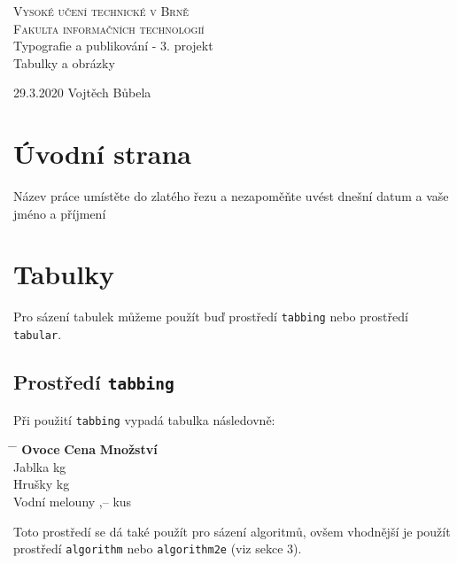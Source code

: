 \documentclass[11pt, ]{article}
\begin{document}
\begin{titlepage}
\begin{center}
\Huge
\textsc{Vysoké učení technické v Brně \\
\huge
Fakulta informačních technologií}\\[0.4em]
\LARGE
Typografie a publikování - 3. projekt\\[0.3em]
\Huge
Tabulky a obrázky
\end{center}
\large29.3.2020 \hfill Vojtěch Bůbela

\end{titlepage}

\section{Úvodní strana}

Název práce umístěte do zlatého řezu a nezapoměňte uvést dnešní datum a vaše jméno a příjmení

\section{Tabulky}
Pro sázení tabulek můžeme použít buď prostředí \verb!tabbing! nebo prostředí \verb!tabular!.

\subsection{Prostředí \texttt{tabbing}}

Při použití \verb!tabbing! vypadá tabulka následovně:

\begin{tabbing}
\hspace{3cm}               \= \hspace{1.5cm}    \= \hspace{2cm}    \kill
\textbf{Ovoce}             \> \textbf{Cena}     \> \textbf{Množství}    \\ 
Jablka                                   kg                 \\
Hrušky                                   kg               \\
Vodní melouny              ,--              kus                \\
\end{tabbing}
Toto prostředí se dá také použít pro sázení algoritmů, ovšem vhodnější je použít 
prostředí \verb!algorithm! nebo \verb!algorithm2e! (viz sekce 3).
\end{document}
